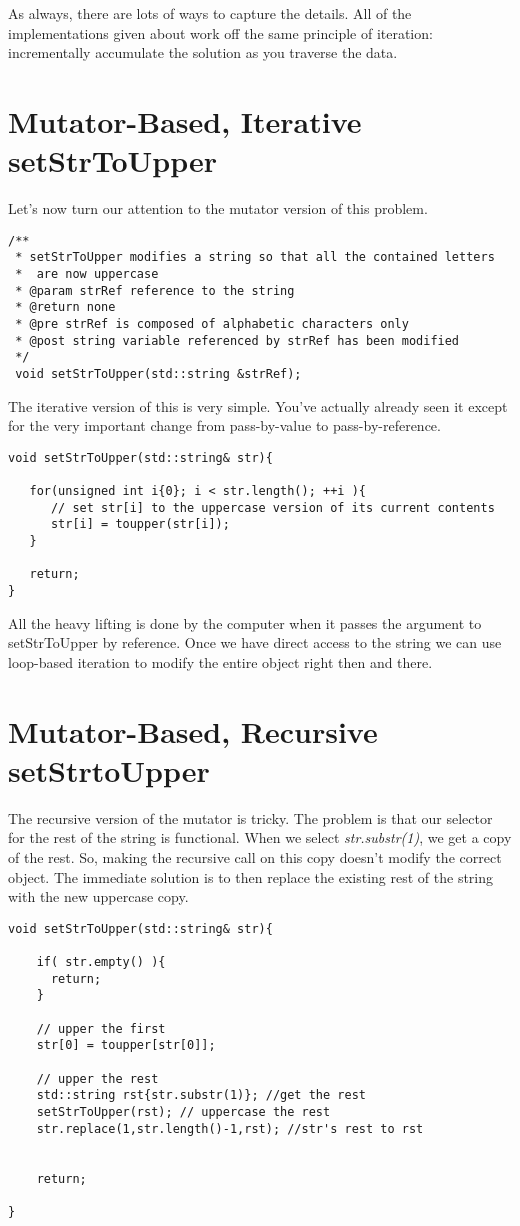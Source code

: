 \documentclass[]{tufte-handout}
\begin{document}
As always, there are lots of ways to capture the details.  All of the implementations given about work off the same principle of iteration: incrementally accumulate the solution as you traverse the data. 

\section{Mutator-Based, Iterative setStrToUpper}

Let's now turn our attention to the mutator version of this problem.
\begin{verbatim}
/** 
 * setStrToUpper modifies a string so that all the contained letters 
 *  are now uppercase
 * @param strRef reference to the string
 * @return none
 * @pre strRef is composed of alphabetic characters only
 * @post string variable referenced by strRef has been modified
 */
 void setStrToUpper(std::string &strRef);
\end{verbatim}

The iterative version of this is very simple.  You've actually already seen it except for the very important change from pass-by-value to pass-by-reference.
\begin{verbatim}
void setStrToUpper(std::string& str){
   
   for(unsigned int i{0}; i < str.length(); ++i ){
	  // set str[i] to the uppercase version of its current contents
      str[i] = toupper(str[i]);
   }
   
   return;
}
\end{verbatim}
All the heavy lifting is done by the computer when it passes the argument to setStrToUpper by reference. Once we have direct access to the string we can use loop-based iteration to modify the entire object right then and there.  

\section{Mutator-Based, Recursive setStrtoUpper}

The recursive version of the mutator is tricky.  The problem is that our selector for the rest of the string is functional. When we select \textit{str.substr(1)}, we get a copy of the rest. So, making the recursive call on this copy doesn't modify the correct object. The immediate solution is to then replace the existing rest of the string with the new uppercase copy.
\begin{verbatim}
void setStrToUpper(std::string& str){
   
	if( str.empty() ){
	  return;
	}

	// upper the first		  
	str[0] = toupper[str[0]];
	
	// upper the rest
	std::string rst{str.substr(1)}; //get the rest
	setStrToUpper(rst); // uppercase the rest
	str.replace(1,str.length()-1,rst); //str's rest to rst  
    
    
    return;	  

}
\end{verbatim}
\end{document}
